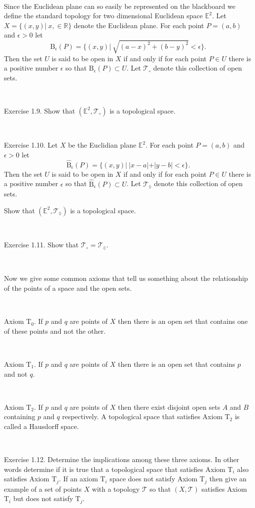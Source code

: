 \documentclass[12pt, std]{article}
\begin{document}
\

Since the Euclidean plane can so easily be represented on the
blackboard we define the standard topology for two dimensional
Euclidean space $\mathbb{E}^2$.  Let $X = \{(x,y) | \ x, \in \mathbb{R} \} $ denote the Euclidean plane.  For each point $P = (a,b)$ and $\epsilon > 0$ let $$\mbox{B}_\epsilon(P) = \{ (x,y) | \ \sqrt{(a-x)^2 + (b-y)^2} < \epsilon \}.$$
Then the set $U$ is said to be open in $X$ if and only if for each point $P \in U$ there is a positive number $\epsilon$
so that $\mbox{B}_\epsilon(P) \subset U$.  Let $\mathcal{T}_\circ$ denote this collection of open sets.

\

Exercise 1.9.  Show that $(\mathbb{E}^2, \mathcal{T}_\circ)$ is a topological space.

\

Exercise 1.10.  Let $X$ be the Euclidian plane $\mathbb{E}^2$.  For each point $P = (a,b)$ and $\epsilon > 0$ let $$\hat{ \mbox{B}}_{\epsilon}(P) = \{ (x,y) | \ |x-a| + |y-b| < \epsilon \}.$$
Then the set $U$ is said to be open in $X$ if and only if for each point $P \in U$ there is a positive number $\epsilon$
so that $\hat {\mbox{B}}_\epsilon(P) \subset U$.  Let $\mathcal{T}_\lozenge$ denote this collection of open sets.

Show that $(\mathbb{E}^2, \mathcal{T}_\lozenge)$ is a topological space.

\

Exercise 1.11.  Show that $\mathcal{T}_\circ = \mathcal{T}_\lozenge$.

\

Now we give some common axioms that tell us something about the
relationship of the points of a space and the open sets.

\


Axiom $\textrm{T}_0$.  If $p$ and $q$ are points of $X$ then there
is an open set that contains one of these points and not the other.

\

Axiom $\textrm{T}_1$. If $p$ and $q$ are points of $X$ then there is
an open set that contains $p$ and not $q$.

\

Axiom $\textrm{T}_2$.  If $p$ and $q$ are points of $X$ then there
exist disjoint open sets $A$ and $B$ containing $p$ and $q$
respectively. A topological space that satisfies Axiom
$\textrm{T}_2$ is called a Hausdorff space.

\

Exercise 1.12.  Determine the implications among these three axioms.
In other words determine if it is true that a topological space that
satisfies Axiom $\textrm{T}_i$ also satisfies Axiom $\textrm{T}_j$.
If an axiom $\textrm{T}_i$ space does not satisfy Axiom
$\textrm{T}_j$ then give an example of a set of points $X$ with a
topology $\mathcal{T}$ so that $(X, \mathcal{T})$ satisfies Axiom
$\textrm{T}_i$ but does not satisfy $\textrm{T}_j$.
\end{document}
